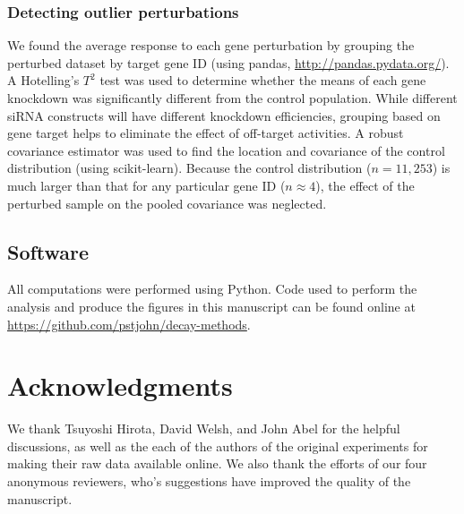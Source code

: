 \documentclass[11pt, letterpaper]{article}
\begin{document}
\subsubsection*{Detecting outlier perturbations}
We found the average response to each gene perturbation by grouping the perturbed dataset by target gene ID (using pandas, \url{http://pandas.pydata.org/}).
A Hotelling's $T^2$ test was used to determine whether the means of each gene knockdown was significantly different from the control population.
While different siRNA constructs will have different knockdown efficiencies, grouping based on gene target helps to eliminate the effect of off-target activities. 
A robust covariance estimator was used to find the location and covariance of the control distribution (using scikit-learn).
Because the control distribution ($n=11,253$) is much larger than that for any particular gene ID ($n \approx 4$), the effect of the perturbed sample on the pooled covariance was neglected.

\subsection*{Software}
All computations were performed using Python.
Code used to perform the analysis and produce the figures in this manuscript can be found online at \url{https://github.com/pstjohn/decay-methods}.






\section*{Acknowledgments}
We thank Tsuyoshi Hirota, David Welsh, and John Abel for the helpful discussions, as well as the each of the authors of the original experiments for making their raw data available online.
We also thank the efforts of our four anonymous reviewers, who's suggestions have improved the quality of the manuscript.





\clearpage
\end{document}
